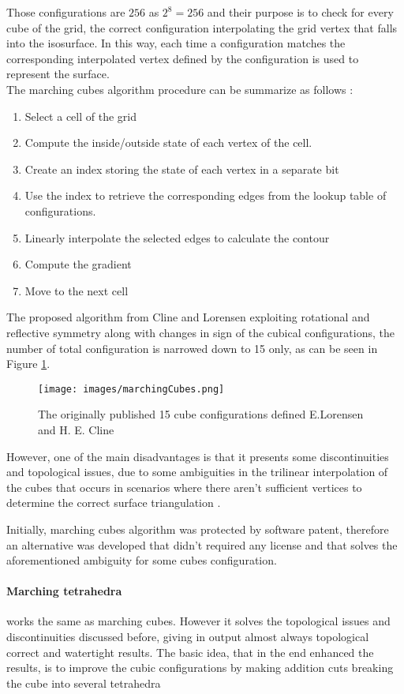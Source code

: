 \documentclass[12pt,a4paper]{extarticle}
\begin{document}
Those configurations are $256$ as $2^8 = 256$ and their purpose is to check for every cube of the grid, the correct configuration interpolating the grid vertex that falls into the isosurface. In this way, each time a configuration matches the corresponding interpolated vertex defined by the configuration is used to represent the surface.\\
The marching cubes algorithm procedure can be summarize as follows \cite{SCHROEDER20053}:
\begin{enumerate}
\item Select a cell of the grid
\item Compute the inside/outside state of each vertex of the cell.
\item Create an index storing the state of each vertex in a separate bit
\item Use the index to retrieve the corresponding edges from the lookup table of configurations.
\item Linearly interpolate the selected edges to calculate the contour
\item Compute the gradient
\item Move to the next cell
\end{enumerate}

The proposed algorithm from Cline and Lorensen exploiting rotational and reflective symmetry along with changes in sign of the cubical configurations, the number of total configuration is narrowed down to 15 only, as can be seen in Figure \ref{fig:marchingcubes_configs}. 

\begin{figure}[hbtp]
\centering
\texttt{[image: images/marchingCubes.png]}
\caption{The originally published 15 cube configurations defined E.Lorensen and H. E. Cline}
\label{fig:marchingcubes_configs}
\end{figure}

However, one of the main disadvantages is that it presents some discontinuities and topological issues, due to some ambiguities in the trilinear interpolation of the cubes that occurs in scenarios where there aren't sufficient vertices to determine the correct surface triangulation \cite{Lorensen:1987:MCH:37402.37422}.

Initially, marching cubes algorithm was protected by software patent, therefore an alternative was developed that didn't required any license and that solves the aforementioned ambiguity for some cubes configuration.

\paragraph{Marching tetrahedra} works the same as marching cubes. However it solves the topological issues and discontinuities discussed before, giving in output almost always topological correct and watertight results.
The basic idea, that in the end enhanced the results, is to improve the cubic configurations by making addition cuts breaking the cube into several tetrahedra \cite{Doi1991Jan}
\end{document}
